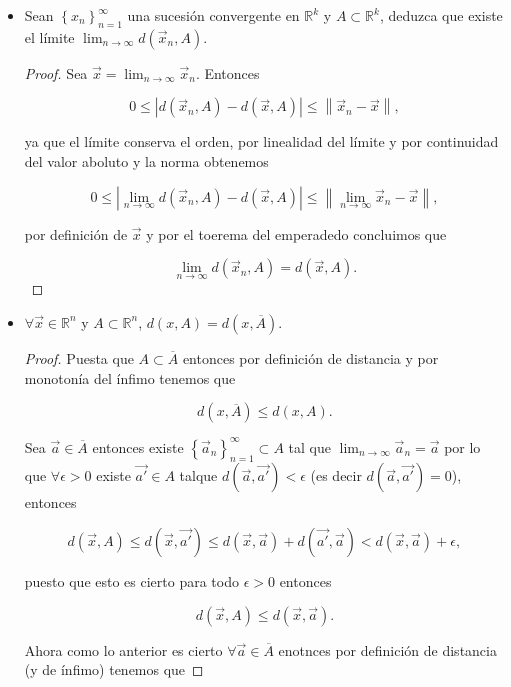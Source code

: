 \documentclass[letterpaper]{article}
\theoremstyle{definition}
\theoremstyle{lemathm}
\theoremstyle{lemathm}
\theoremstyle{lemathm}
\theoremstyle{lemademthm}
\newcommand{\limtoinf}[1]{\lim_{#1\to\infty}}
\newcommand{\abs}[1]{\left| #1 \right| }
\newcommand{\pars}[1]{\left( #1 \right) }
\newcommand{\norm}[1]{\left\lVert#1\right\rVert}
\newcommand{\set}[1]{\left \{ #1 \right\} }
\newcommand{\RR}{\mathbb{R}}
\newcommand{\1}{\mathbbm{1}}
\begin{document}
\begin{enumerate}
\begin{itemize}
\begin{proof}
			\end{proof}
			

			\item Sean $\set{x_n}_{n=1}^{\infty}$ una sucesión convergente en $\RR^k$ y $A\subset\RR^k$, deduzca que existe el límite $\lim_{n\to\infty}d\pars{\vec{x}_n,A}$.
			
			\begin{proof}
				
				Sea $\vec{x} = \limtoinf{n} \vec{x}_n$. Entonces
	
				\[0 \leq \abs{d\pars{\vec{x}_n,A} - d\pars{\vec{x},A}} \leq \norm{\vec{x}_n-\vec{x}},\]
	
				ya que el límite conserva el orden, por linealidad del límite y por continuidad del valor aboluto y la norma obtenemos
	
				\[0 \leq \abs{\limtoinf{n}d\pars{\vec{x}_n,A} - d\pars{\vec{x},A}} \leq \norm{\limtoinf{n}\vec{x}_n-\vec{x}},\]
	
				por definición de $\vec{x}$ y por el toerema del emperadedo concluimos que
	
				\[\limtoinf{n}d\pars{\vec{x}_n,A} = d\pars{\vec{x},A}.\]

			\end{proof}
			

			\item $\forall\vec{x}\in\RR^n$ y $A\subset\RR^n$, $d\pars{x,A} = d\pars{x,\overline{A}}$.
			
			\begin{proof}
				
				Puesta que $A\subset \overline{A}$ entonces por definición de distancia y por monotonía del ínfimo tenemos que
	
				\[d\pars{x,\overline{A}} \leq d\pars{x,A}.\]
	
				Sea $\vec{a} \in \overline{A}$ entonces existe $\set{\vec{a}_n}_{n=1}^{\infty} \subset A$ tal que $\limtoinf{n} \vec{a}_n = \vec{a}$ por lo que $\forall \epsilon > 0$ existe $\vec{a'}\in A$ talque $d\pars{\vec{a},\vec{a'}} < \epsilon$ (es decir $d\pars{\vec{a},\vec{a'}} = 0$), entonces
	
				\[d\pars{\vec{x},A} \leq d\pars{\vec{x},\vec{a'}} \leq d\pars{\vec{x}, \vec{a}} + d\pars{\vec{a'}, \vec{a}} < d\pars{\vec{x}, \vec{a}} + \epsilon,\]
	
				puesto que esto es cierto para todo $\epsilon > 0$ entonces
	
				\[d\pars{\vec{x},A} \leq d\pars{\vec{x}, \vec{a}}.\]
	
				Ahora como lo anterior es cierto $\forall \vec{a} \in \overline{A}$ enotnces por definición de distancia (y de ínfimo) tenemos que
	

\end{proof}
\end{itemize}
\end{enumerate}
\end{document}
